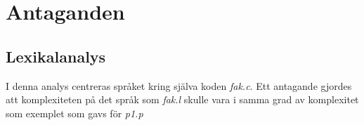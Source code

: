 \section{Antaganden}

\subsection{Lexikalanalys}
I denna analys centreras språket kring själva koden \textit{fak.c}. Ett antagande gjordes att
komplexiteten på det språk som \textit{fak.l} skulle vara i samma grad av komplexitet som exemplet som gavs för
\textit{p1.p} 
